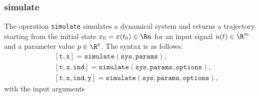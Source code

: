 \subsubsection{simulate} \label{sec:simulate}

The operation \texttt{simulate} simulates a dynamical system and returns a trajectory starting from the initial state $x_0 = x(t_0) \in \Rn$ for an input signal $u(t) \in \R^m$ and a parameter value $p \in \R^p$. The syntax is as follows:
\begin{equation*}
	\begin{split}
		& [\texttt{t},\texttt{x}] = \texttt{simulate}(\texttt{sys},\texttt{params}), \\
		& [\texttt{t},\texttt{x},\texttt{ind}] = \texttt{simulate}(\texttt{sys},\texttt{params},\texttt{options}), \\
		& [\texttt{t},\texttt{x},\texttt{ind},\texttt{y}] = \texttt{simulate}(\texttt{sys},\texttt{params},\texttt{options}),
	\end{split}
\end{equation*} 
with the input arguments
